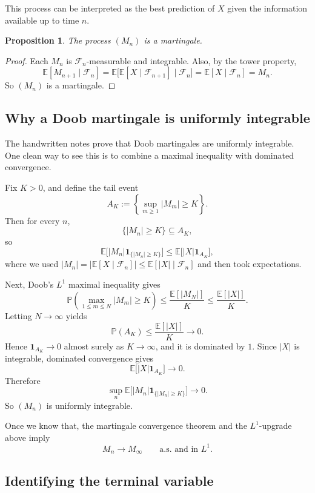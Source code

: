 \documentclass[11pt]{article}
\newtheorem{proposition}[theorem]{Proposition}
\theoremstyle{definition}
\begin{document}
This process can be interpreted as the best prediction of \(X\) given the information available up to time \(n\).

\begin{proposition}
The process \((M_n)\) is a martingale.
\end{proposition}

\begin{proof}
Each \(M_n\) is \(\mathcal F_n\)-measurable and integrable. Also, by the tower property,
\[
\mathbb E[M_{n+1}\mid \mathcal F_n]
=
\mathbb E\bigl[\mathbb E[X\mid \mathcal F_{n+1}]\mid \mathcal F_n\bigr]
=
\mathbb E[X\mid \mathcal F_n]
=
M_n.
\]
So \((M_n)\) is a martingale.
\end{proof}

\subsection{Why a Doob martingale is uniformly integrable}

The handwritten notes prove that Doob martingales are uniformly integrable. One clean way to see this is to combine a maximal inequality with dominated convergence.

Fix \(K>0\), and define the tail event
\[
A_K := \left\{\sup_{m\ge 1}|M_m|\ge K\right\}.
\]
Then for every \(n\),
\[
\{|M_n|\ge K\} \subseteq A_K,
\]
so
\[
\mathbb E\bigl[|M_n|\mathbf 1_{\{|M_n|\ge K\}}\bigr]
\le
\mathbb E\bigl[|X|\mathbf 1_{A_K}\bigr],
\]
where we used \(|M_n|=|\mathbb E[X\mid \mathcal F_n]|\le \mathbb E[|X|\mid \mathcal F_n]\) and then took expectations.

Next, Doob's \(L^1\) maximal inequality gives
\[
\mathbb P\!\left(\max_{1\le m\le N}|M_m|\ge K\right)
\le
\frac{\mathbb E[|M_N|]}{K}
\le
\frac{\mathbb E[|X|]}{K}.
\]
Letting \(N\to\infty\) yields
\[
\mathbb P(A_K) \le \frac{\mathbb E[|X|]}{K} \to 0.
\]
Hence \(\mathbf 1_{A_K}\to 0\) almost surely as \(K\to\infty\), and it is dominated by \(1\). Since \(|X|\) is integrable, dominated convergence gives
\[
\mathbb E\bigl[|X|\mathbf 1_{A_K}\bigr] \to 0.
\]
Therefore
\[
\sup_n
\mathbb E\bigl[|M_n|\mathbf 1_{\{|M_n|\ge K\}}\bigr] \to 0.
\]
So \((M_n)\) is uniformly integrable.

Once we know that, the martingale convergence theorem and the \(L^1\)-upgrade above imply
\[
M_n \to M_\infty
\qquad \text{a.s. and in } L^1.
\]

\subsection{Identifying the terminal variable}
\end{document}
